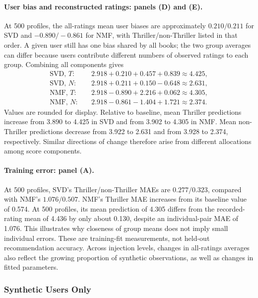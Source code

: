 \paragraph{User bias and reconstructed ratings: panels (D) and (E).}
At 500 profiles, the all-ratings mean user biases are approximately $0.210/0.211$ for SVD and $-0.890/-0.861$ for NMF, with Thriller/non-Thriller listed in that order. A given user still has one bias shared by all books; the two group averages can differ because users contribute different numbers of observed ratings to each group. Combining all components gives
\begin{equation}
\label{eq:training_all_numeric}
\begin{aligned}
\text{SVD, }T:&\quad 2.918+0.210+0.457+0.839\approx4.425,\\
\text{SVD, }N:&\quad 2.918+0.211+0.150-0.648\approx2.631,\\
\text{NMF, }T:&\quad 2.918-0.890+2.216+0.062\approx4.305,\\
\text{NMF, }N:&\quad 2.918-0.861-1.404+1.721\approx2.374.
\end{aligned}
\end{equation}
Values are rounded for display. Relative to baseline, mean Thriller predictions increase from 3.890 to 4.425 in SVD and from 3.902 to 4.305 in NMF. Mean non-Thriller predictions decrease from 3.922 to 2.631 and from 3.928 to 2.374, respectively. Similar directions of change therefore arise from different allocations among score components.

\paragraph{Training error: panel (A).}
At 500 profiles, SVD's Thriller/non-Thriller MAEs are $0.277/0.323$, compared with NMF's $1.076/0.507$. NMF's Thriller MAE increases from its baseline value of 0.574. At 500 profiles, its mean prediction of 4.305 differs from the recorded-rating mean of 4.436 by only about 0.130, despite an individual-pair MAE of 1.076. This illustrates why closeness of group means does not imply small individual errors. These are training-fit measurements, not held-out recommendation accuracy. Across injection levels, changes in all-ratings averages also reflect the growing proportion of synthetic observations, as well as changes in fitted parameters.

\subsubsection{Synthetic Users Only}

